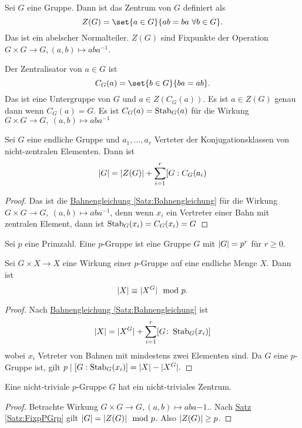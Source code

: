 \begin{Def}
    Sei $G$ eine Gruppe. Dann ist das Zentrum von $G$ definiert als
    $$Z(G)=\set{a\in G}{ab=ba\ \forall b\in G}.$$ Das ist ein abelscher Normalteiler. $Z(G)$ sind Fixpunkte der Operation $G\times G\to G, (a,b)\mapsto aba^{-1}$.
\end{Def}
\begin{Def}
    Der Zentralisator von $a\in G$ ist $$C_G(a)=\set{b\in G}{ba=ab}.$$ Das ist eine Untergruppe von $G$ und $a\in Z(C_G(a))$. Es ist $a\in Z(G)$ genau dann wenn $C_G(a)=G$. Es ist $C_G(a)=\operatorname{Stab}_G(a)$ für die Wirkung $G\times G\to G,\ (a,b)\mapsto aba^{-1}$
\end{Def}
\begin{Satz}[Klassengleichung]\label{Satz:Klassengleichung}
    Sei $G$ eine endliche Gruppe und $a_1,\dots,a_r$ Verteter der Konjugationsklassen von nicht-zentralen Elementen. Dann ist 
    $$\lvert G\rvert=\lvert Z(G)\rvert+\sum_{i=1}^r[G:C_G(a_i)$$
\end{Satz}
\begin{proof}
    Das ist die \hyperref[Satz:Bahnengleichung]{Bahnengleichung \ref{Satz:Bahnengleichung}} für die Wirkung $G\times G\to G,\ (a,b)\mapsto aba^{-1}$, denn wenn $x_i$ ein Vertreter einer Bahn mit zentralen Element, dann ist $\operatorname{Stab}_G(x_i)=C_G(x_i)=G$
\end{proof}
\begin{Def}
    Sei $p$ eine Primzahl. Eine $p$-Gruppe ist eine Gruppe $G$ mit $\lvert G\rvert=p^r$ für $r\geq 0$. 
\end{Def}
\begin{Satz}\label{Satz:FixpPGrp}
    Sei $G\times X\to X$ eine Wirkung einer $p$-Gruppe auf eine endliche Menge $X$. Dann ist 
    $$\lvert X\rvert\equiv \lvert X^G\rvert\mod p.$$
\end{Satz}
\begin{proof}
    Nach \hyperref[Satz:Bahnengleichung]{Bahnengleichung \ref{Satz:Bahnengleichung}} ist 
    $$\lvert X\rvert=\lvert X^G\rvert+\sum_{i=1}^r[G\colon \operatorname{Stab}_G(x_i)]$$ wobei $x_i$ Vetreter von Bahnen mit mindestens zwei Elementen sind. Da $G$ eine $p$-Gruppe ist, gilt 
    $p\mid [G:\operatorname{Stab}_G(x_i)]=\lvert X\rvert-\lvert X^G\rvert.$
\end{proof}
\begin{Satz}\label{Satz:pGrpZentrum}
    Eine nicht-triviale $p$-Gruppe $G$ hat ein nicht-triviales Zentrum.
\end{Satz}
\begin{proof}
    Betrachte Wirkung $G\times G\to G, (a,b)\mapsto aba{-1}.$. Nach \hyperref[Satz:FixpPGrp]{ Satz \ref{Satz:FixpPGrp}} gilt $\lvert G\rvert=\lvert Z(G)\rvert\mod p$. Also $\lvert Z(G)\rvert\geq p$.
\end{proof}

